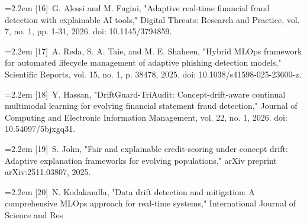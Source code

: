 \documentclass[11pt,letterpaper]{report}
\newcommand{\bibentry}[2]{\par\hangindent=2.2em\hangafter=1 [#1]\ #2\par}
\begin{document}
\bibentry{16}{G. Alessi and M. Fugini, "Adaptive real-time financial fraud detection with explainable AI tools," Digital Threats: Research and Practice, vol. 7, no. 1, pp. 1-31, 2026. doi: 10.1145/3794859.}

\bibentry{17}{A. Reda, S. A. Taie, and M. E. Shaheen, "Hybrid MLOps framework for automated lifecycle management of adaptive phishing detection models," Scientific Reports, vol. 15, no. 1, p. 38478, 2025. doi: 10.1038/s41598-025-23600-z.}

\bibentry{18}{Y. Hassan, "DriftGuard-TriAudit: Concept-drift-aware continual multimodal learning for evolving financial statement fraud detection," Journal of Computing and Electronic Information Management, vol. 22, no. 1, 2026. doi: 10.54097/5bjxgq31.}

\bibentry{19}{S. John, "Fair and explainable credit-scoring under concept drift: Adaptive explanation frameworks for evolving populations," arXiv preprint arXiv:2511.03807, 2025.}

\bibentry{20}{N. Kodakandla, "Data drift detection and mitigation: A comprehensive MLOps approach for real-time systems," International Journal of Science and Res}
\end{document}
